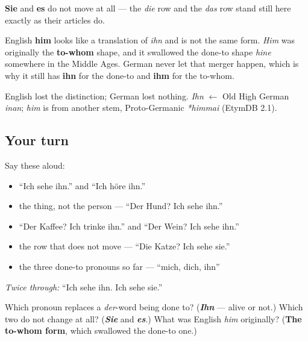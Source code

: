 \textbf{Sie} and \textbf{es} do not move at all — the \emph{die} row and the \emph{das} row stand still here exactly as their articles do.

\begin{cousinweb}
English \textbf{him} looks like a translation of \emph{ihn} and is not the same form. \emph{Him} was originally the \textbf{to-whom} shape, and it swallowed the done-to shape \emph{hine} somewhere in the Middle Ages. German never let that merger happen, which is why it still has \textbf{ihn} for the done-to and \textbf{ihm} for the to-whom.

English lost the distinction; German lost nothing. \emph{Ihn} $\leftarrow$ Old High German \emph{inan}; \emph{him} is from another stem, Proto-Germanic \emph{*himmai} (EtymDB 2.1).
\end{cousinweb}

\subsection*{Your turn}
Say these aloud:

\begin{itemize}
\raggedright
  \item \textquotedblleft{}Ich sehe ihn.\textquotedblright{} and \textquotedblleft{}Ich höre ihn.\textquotedblright{}
  \item the thing, not the person — \textquotedblleft{}Der Hund? Ich sehe ihn.\textquotedblright{}
  \item \textquotedblleft{}Der Kaffee? Ich trinke ihn.\textquotedblright{} and \textquotedblleft{}Der Wein? Ich sehe ihn.\textquotedblright{}
  \item the row that does not move — \textquotedblleft{}Die Katze? Ich sehe sie.\textquotedblright{}
  \item the three done-to pronouns so far — \textquotedblleft{}mich, dich, ihn\textquotedblright{}
\end{itemize}

\emph{Twice through:} \textquotedblleft{}Ich sehe ihn. Ich sehe sie.\textquotedblright{}

\begin{tcolorbox}[breakable,colback=teal!4,colframe=teal!35!black,title={Before you move on}]
Which pronoun replaces a \emph{der}-word being done to? (\emph{\textbf{Ihn}} — alive or not.) Which two do not change at all? (\emph{\textbf{Sie}} and \emph{\textbf{es}}.) What was English \emph{him} originally? (\textbf{The to-whom form}, which swallowed the done-to one.)
\end{tcolorbox}
